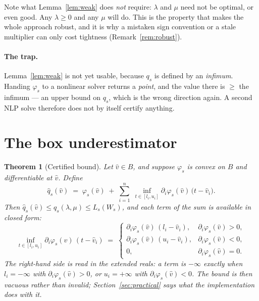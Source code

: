 \documentclass[11pt]{article}
\theoremstyle{plain}
\newtheorem{theorem}[lemma]{Theorem}
\theoremstyle{remark}
\newcommand{\W}{W}
\newcommand{\vhat}{\hat{v}}
\newcommand{\qhat}{\hat{q}}
\begin{document}
Note what Lemma~\ref{lem:weak} does \emph{not} require: $\lambda$ and $\mu$ need
not be optimal, or even good.  Any $\lambda \ge 0$ and any $\mu$ will do.  This
is the property that makes the whole approach robust, and it is why a mistaken
sign convention or a stale multiplier can only cost tightness
(Remark~\ref{rem:robust}).

\paragraph{The trap.}
Lemma~\ref{lem:weak} is not yet usable, because $q_s$ is defined by an
\emph{infimum}.  Handing $\varphi_s$ to a nonlinear solver returns a
\emph{point}, and the value there is $\ge$ the infimum --- an upper bound on
$q_s$, which is the wrong direction again.  A second NLP solve therefore does
not by itself certify anything.

\section{The box underestimator}

\begin{theorem}[Certified bound]\label{thm:main}
Let $\vhat \in B$, and suppose $\varphi_s$ is convex on $B$ and differentiable
at $\vhat$.  Define
\begin{equation}\label{eq:qhat}
  \qhat_s(\vhat) \;=\; \varphi_s(\vhat)
    \;+\; \sum_{i=1}^{n} \; \inf_{t \in [l_i,u_i]}
          \partial_i \varphi_s(\vhat)\,\bigl(t - \vhat_i\bigr).
\end{equation}
Then $\qhat_s(\vhat) \le q_s(\lambda,\mu) \le L_s(\W_s)$, and each term of the
sum is available in closed form:
\begin{equation}\label{eq:closed}
  \inf_{t \in [l_i,u_i]} \partial_i \varphi_s(\vhat)\,(t - \vhat_i)
  \;=\;
  \begin{cases}
    \partial_i \varphi_s(\vhat)\,(l_i - \vhat_i), & \partial_i \varphi_s(\vhat) > 0,\\[2pt]
    \partial_i \varphi_s(\vhat)\,(u_i - \vhat_i), & \partial_i \varphi_s(\vhat) < 0,\\[2pt]
    0, & \partial_i \varphi_s(\vhat) = 0.
  \end{cases}
\end{equation}
The right-hand side is read in the extended reals: a term is $-\infty$ exactly
when $l_i = -\infty$ with $\partial_i \varphi_s(\vhat) > 0$, or $u_i = +\infty$
with $\partial_i \varphi_s(\vhat) < 0$.  The bound is then vacuous rather than
invalid; Section~\ref{sec:practical} says what the implementation does with it.
\end{theorem}
\end{document}
